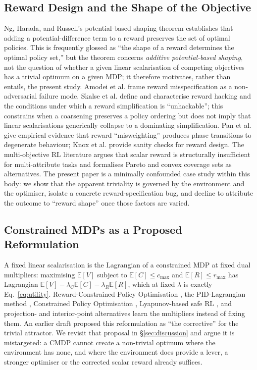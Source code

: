\documentclass[10pt,twocolumn]{article}
\begin{document}
\subsection{Reward Design and the Shape of the Objective}
Ng, Harada, and Russell's potential-based shaping theorem \cite{ng1999shaping}
establishes that adding a potential-difference term to a reward preserves the set
of optimal policies. This is frequently glossed as ``the shape of a reward
determines the optimal policy set,'' but the theorem concerns \emph{additive
potential-based shaping}, not the question of whether a given linear
scalarisation of competing objectives has a trivial optimum on a given MDP; it
therefore motivates, rather than entails, the present study. Amodei et al.
\cite{amodei2016concrete} frame reward misspecification as a non-adversarial
failure mode. Skalse et al. \cite{skalse2022hacking} define and characterise
reward hacking and the conditions under which a reward simplification is
``unhackable''; this constrains when a coarsening preserves a policy ordering but
does not imply that linear scalarisations generically collapse to a dominating
simplification. Pan et al. \cite{pan2022misspecification} give empirical evidence
that reward ``misweighting'' produces phase transitions to degenerate behaviour;
Knox et al. \cite{knox2023reward} provide sanity checks for reward design. The
multi-objective RL literature \cite{roijers2013morl,vamplew2022scalar} argues
that scalar reward is structurally insufficient for multi-attribute tasks and
formalises Pareto and convex coverage sets as alternatives. The present paper is
a minimally confounded case study within this body: we show that the apparent
triviality is governed by the environment and the optimiser, isolate a concrete
reward-specification bug, and decline to attribute the outcome to ``reward
shape'' once those factors are varied.

\subsection{Constrained MDPs as a Proposed Reformulation}
A fixed linear scalarisation is the Lagrangian of a constrained MDP
\cite{altman1999cmdp} at fixed dual multipliers: maximising
$\mathbb{E}[V]$ subject to $\mathbb{E}[C]\le c_{\max}$ and
$\mathbb{E}[R]\le r_{\max}$ has Lagrangian $\mathbb{E}[V]-\lambda_C\mathbb{E}[C]-
\lambda_R\mathbb{E}[R]$, which at fixed $\lambda$ is exactly
Eq.~\eqref{eq:utility}. Reward-Constrained Policy Optimisation
\cite{tessler2019rcpo}, the PID-Lagrangian method \cite{stooke2020pid},
Constrained Policy Optimisation \cite{achiam2017cpo}, Lyapunov-based safe RL
\cite{chow2018lyapunov}, and projection- and interior-point alternatives
\cite{yang2020pcpo,liu2020ipo} learn the multipliers instead of fixing them.
An earlier draft proposed this reformulation as ``the corrective'' for the
trivial attractor. We revisit that proposal in \S\ref{sec:discussion} and argue
it is mistargeted: a CMDP cannot create a non-trivial optimum where the
environment has none, and where the environment does provide a lever, a stronger
optimiser or the corrected scalar reward already suffices.
\end{document}
